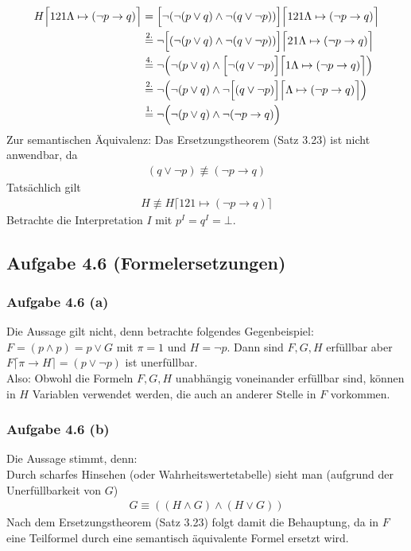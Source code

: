 \begin{align*}
	H\Big\lceil 121\Lambda\mapsto(\neg p\to q)\Big\rceil
	&=
	\Big[\neg(\neg(p\vee q)\wedge\neg(q\vee\neg p))\Big]\Big\lceil 121\Lambda\mapsto(\neg p\to q)\Big\rceil\\
	&\overset{\text{2.}}{=}
	\neg\Big[(\neg(p\vee q)\wedge\neg(q\vee\neg p))\Big]\Big\lceil 21\Lambda\mapsto(\neg p\to q)\Big\rceil\\
	&\overset{\text{4.}}{=}
	\neg\Big(\neg(p\vee q)\wedge\Big[\neg(q\vee\neg p)\Big]\Big\lceil 1\Lambda\mapsto(\neg p\to q)\Big\rceil\Big)\\
	&\overset{\text{2.}}{=}
	\neg\Big(\neg(p\vee q)\wedge\neg\Big[(q\vee\neg p)\Big]\Big\lceil\Lambda\mapsto(\neg p\to q)\Big\rceil\Big)\\
	&\overset{\text{1.}}{=}
	\neg\Big(\neg(p\vee q)\wedge\neg(\neg p\to q)\Big)
\end{align*}
Zur semantischen Äquivalenz: Das Ersetzungstheorem (Satz 3.23) ist nicht anwendbar, da 
\begin{align*}
	(q\vee\neg p)\not\equiv(\neg p\to q)
\end{align*}
Tatsächlich gilt
\begin{align*}
	H\not\equiv H\lceil 121\mapsto(\neg p\to q)\rceil
\end{align*}
Betrachte die Interpretation $I$ mit $p^I=q^I=\bot$.

\subsection{Aufgabe 4.6 (Formelersetzungen)}
\subsubsection{Aufgabe 4.6 (a)}
Die Aussage gilt nicht, denn betrachte folgendes Gegenbeispiel:\\
$F=(p\wedge p)=p\vee G$ mit $\pi=1$ und $H=\neg p$. 
Dann sind $F,G,H$ erfüllbar aber \\
$F\lceil\pi\to H\rceil=(p\vee\neg p)$ ist unerfüllbar.\\
Also: Obwohl die Formeln $F,G,H$ unabhängig voneinander erfüllbar sind, können in $H$ Variablen verwendet werden, die auch an anderer Stelle in $F$ vorkommen.

\subsubsection{Aufgabe 4.6 (b)}
Die Aussage stimmt, denn:\\
Durch scharfes Hinsehen (oder Wahrheitswertetabelle) sieht man (aufgrund der Unerfüllbarkeit von $G$)
\begin{align*}
	G\equiv((H\wedge G)\wedge(H\vee G))
\end{align*}
Nach dem Ersetzungstheorem (Satz 3.23) folgt damit die Behauptung, da in $F$ eine Teilformel durch eine semantisch äquivalente Formel ersetzt wird.

